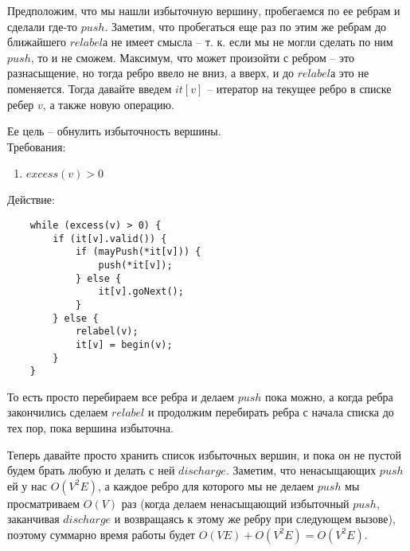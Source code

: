 \begin{algorithm}
    Предположим, что мы нашли избыточную вершину, пробегаемся по ее ребрам и сделали где-то $push$. Заметим, что пробегаться еще раз по этим же ребрам до ближайшего $relabel$а не имеет смысла -- т. к. если мы не могли сделать по ним $push$, то и не сможем. Максимум, что может произойти с ребром -- это разнасыщение, но тогда ребро ввело не вниз, а вверх, и до $relabel$а это не поменяется. Тогда давайте введем $it[v]$ -- итератор на текущее ребро в списке ребер $v$, а также новую операцию.

    \begin{definition}
        Ее цель -- обнулить избыточность вершины. \\
        Требования:
        \begin{enumerate}
            \item $excess(v) > 0$
        \end{enumerate}
        Действие: 
        \begin{lstlisting}
    while (excess(v) > 0) {
        if (it[v].valid()) {
            if (mayPush(*it[v])) {
                push(*it[v]);
            } else {
                it[v].goNext();
            }
        } else {
            relabel(v);
            it[v] = begin(v);
        }
    }
        \end{lstlisting}
        То есть просто перебираем все ребра и делаем $push$ пока можно, а когда ребра закончились сделаем $relabel$ и продолжим перебирать ребра с начала списка до тех пор, пока вершина избыточна.
    \end{definition}

    Теперь давайте просто хранить список избыточных вершин, и пока он не пустой будем брать любую и делать с ней $discharge$. Заметим, что ненасыщающих $push$ей у нас $O(V^2E)$, а каждое ребро для которого мы не делаем $push$ мы просматриваем $O(V)$ раз (когда делаем ненасыщающий избыточный $push$, заканчивая $discharge$ и возвращаясь к этому же ребру при следующем вызове), поэтому суммарно время работы будет $O(VE) + O(V^2E) = O(V^2E)$.


\end{algorithm}
